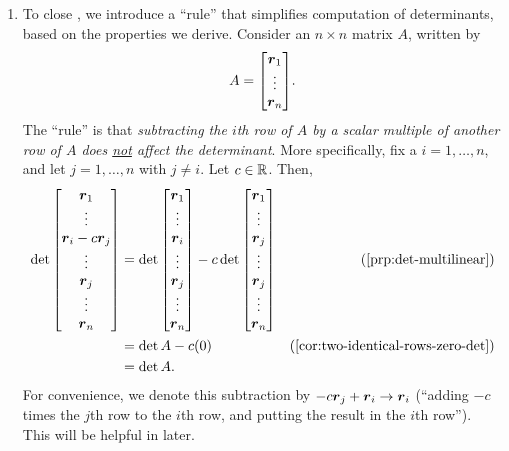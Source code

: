 \begin{enumerate}
\item \label{it:rule-simp-det-calc}
To close , we introduce a ``rule'' that simplifies
computation of determinants, based on the properties we derive. Consider an
\(n\times n\) matrix \(A\), written by
\[
A=\mqty[\vect{r}_{1}\\ \vdots\\ \vect{r}_{n}].
\]
The ``rule'' is that \emph{subtracting the \(i\)th row of \(A\) by a scalar
multiple of another row of \(A\) does \underline{not} affect the determinant}.
More specifically, fix a \(i=1,\dotsc,n\), and let \(j=1,\dotsc,n\) with \(j\ne
i\). Let \(c\in\mathbb{R}\). Then,
\begin{align*}
\det\mqty[\vect{r}_{1}\\ \vdots\\ \vect{r}_{i}-c\vect{r}_j\\\vdots\\\vect{r}_{j}\\\vdots\\ \vect{r}_{n}]
&=\det\mqty[\vect{r}_{1}\\ \vdots\\ \vect{r}_{i}\\\vdots\\\vect{r}_{j}\\\vdots\\ \vect{r}_{n}]
-c\det\mqty[\vect{r}_{1}\\ \vdots\\ \vect{r}_{j}\\\vdots\\\vect{r}_{j}\\\vdots\\ \vect{r}_{n}]&\text{(\Cref{prp:det-multilinear})}\\
&=\det A-c(0)&\text{(\Cref{cor:two-identical-rows-zero-det})}\\
&=\det A.
\end{align*}
For convenience, we denote this subtraction by \(-c\vb*{r}_{j}+\vb*{r}_{i}\to
\vb*{r}_{i}\) (``adding \(-c\) times the \(j\)th row to the \(i\)th row, and
putting the result in the \(i\)th row'').  This will be helpful in 
later.


\end{enumerate}
